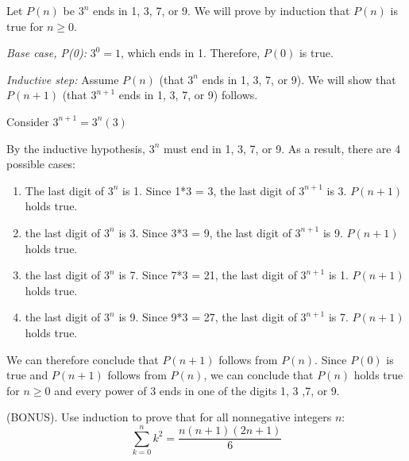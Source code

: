 \documentclass[solution, letterpaper]{cs20inclass}
\begin{document}
\begin{solution}

Let $P(n)$ be $3^n$ ends in 1, 3, 7, or 9. We will prove by induction that $P(n)$ is true for $n\geq0$.

\textit{Base case, P(0):} $3^0 = 1$, which ends in 1. Therefore, $P(0)$ is true.

\textit{Inductive step:} Assume $P(n)$ (that $3^n$ ends in 1, 3, 7, or 9). We will show that $P(n+1)$ (that $3^{n+1}$ ends in 1, 3, 7, or 9) follows.

Consider $3^{n+1} = 3^n (3)$

By the inductive hypothesis, $3^n$ must end in 1, 3, 7, or 9. As a result, there are 4 possible cases:

\begin{enumerate}

\item The last digit of $3^n$ is 1. Since 1*3 = 3, the last digit of $3^{n+1}$ is 3. $P(n+1)$ holds true.

\item the last digit of $3^n$ is 3. Since 3*3 = 9, the last digit of $3^{n+1}$ is 9. $P(n+1)$ holds true.

\item the last digit of $3^n$ is 7. Since 7*3 = 21, the last digit of $3^{n+1}$ is 1. $P(n+1)$ holds true.

\item the last digit of $3^n$ is 9. Since 9*3 = 27, the last digit of $3^{n+1}$ is 7. $P(n+1)$ holds true.

\end{enumerate}

We can therefore conclude that $P(n+1)$ follows from $P(n)$. Since $P(0)$ is true and $P(n+1)$ follows from $P(n)$, we can conclude that $P(n)$ holds true for $n \geq 0$ and every power of $3$ ends in one of the digits 1, 3 ,7, or 9.

\end{solution}

\problem 

(BONUS). Use induction to prove that for all nonnegative integers $n$:
\[ \sum_{k=0}^{n}k^{2}=\frac{n(n+1)(2n+1)}{6} \]
\end{document}
